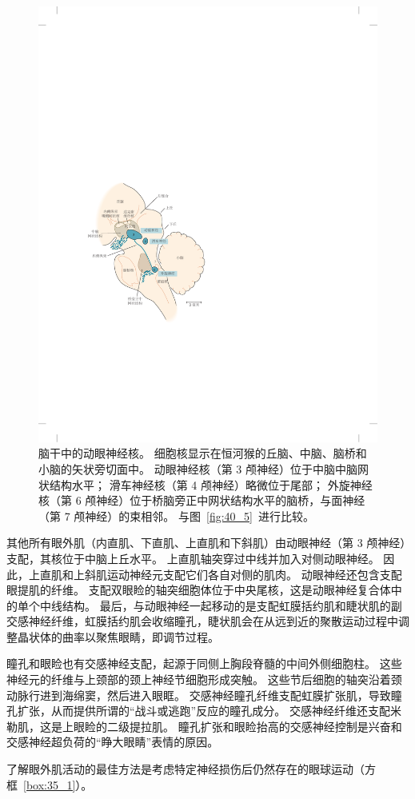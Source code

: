 \begin{figure}[htbp]
	\centering
	\includegraphics[width=0.62\linewidth]{chap35/fig_35_3}
	\caption{脑干中的动眼神经核。
		细胞核显示在恒河猴的丘脑、中脑、脑桥和小脑的矢状旁切面中。
		动眼神经核（第 3 颅神经）位于中脑中脑网状结构水平；
		滑车神经核（第 4 颅神经）略微位于尾部；
		外旋神经核（第 6 颅神经）位于桥脑旁正中网状结构水平的脑桥，与面神经（第 7 颅神经）的束相邻\cite{henn1982primate}。 
		与图~\ref{fig:40_5}~进行比较。}
	\label{fig:35_3}
\end{figure}


其他所有眼外肌（内直肌、下直肌、上直肌和下斜肌）由动眼神经（第 3 颅神经）支配，其核位于中脑上丘水平。
上直肌轴突穿过中线并加入对侧动眼神经。
因此，上直肌和上斜肌运动神经元支配它们各自对侧的肌肉。
动眼神经还包含支配眼提肌的纤维。
支配双眼睑的轴突细胞体位于中央尾核，这是动眼神经复合体中的单个中线结构。
最后，与动眼神经一起移动的是支配虹膜括约肌和睫状肌的副交感神经纤维，虹膜括约肌会收缩瞳孔，睫状肌会在从远到近的聚散运动过程中调整晶状体的曲率以聚焦眼睛，即调节过程。


瞳孔和眼睑也有交感神经支配，起源于同侧上胸段脊髓的中间外侧细胞柱。
这些神经元的纤维与上颈部的颈上神经节细胞形成突触。
这些节后细胞的轴突沿着颈动脉行进到海绵窦，然后进入眼眶。
交感神经瞳孔纤维支配虹膜扩张肌，导致瞳孔扩张，从而提供所谓的“战斗或逃跑”反应的瞳孔成分。
交感神经纤维还支配米勒肌，这是上眼睑的二级提拉肌。
瞳孔扩张和眼睑抬高的交感神经控制是兴奋和交感神经超负荷的“睁大眼睛”表情的原因。



了解眼外肌活动的最佳方法是考虑特定神经损伤后仍然存在的眼球运动（方框~\ref{box:35_1}）。


